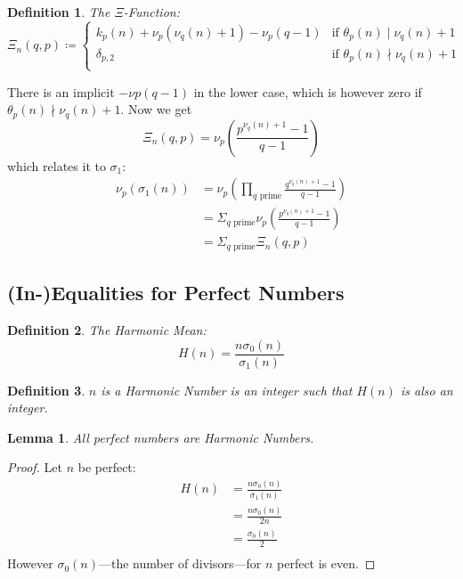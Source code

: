 \documentclass{article}
\newtheorem{definition}{Definition}
\newtheorem{lemma}{Lemma}[section]
\begin{document}
	\begin{definition} The $Ξ$-Function:
		\begin{equation*}
			Ξ_n(q,p) \coloneq 
			\begin{cases}
				k_p(n) + ν_p(ν_q(n) + 1) - ν_p(q-1) & \text{if } θ_p(n) \mid ν_q(n) + 1 \\
				δ_{p,2} & \text{if } θ_p(n) \nmid ν_q(n) + 1 \\
			\end{cases}
		\end{equation*}
	\end{definition}
	There is an implicit $-νp(q-1)$ in the lower case, which is however zero if $θ_p(n) \nmid ν_q(n) + 1$.
	Now we get
	\begin{equation*}
		Ξ_n(q,p) = ν_p\left( \frac{p^{ν_q(n)+1}-1}{q-1} \right)
	\end{equation*}
	which relates it to $σ_1$:
	\begin{equation} \label{eq:6}
		\begin{split}
			ν_p(σ_1(n)) &= ν_p\left(  \prod_{q \text{ prime}} \frac{q^{ν_q(n)+1}-1}{q-1} \right) \\
			&= Σ_{q \text{ prime}} ν_p\left( \frac{p^{ν_q(n)+1}-1}{q-1} \right) \\
			&= Σ_{q \text{ prime}} Ξ_n(q,p)
		\end{split}
	\end{equation}
	
	\subsection{(In-)Equalities for Perfect Numbers}
	
	\begin{definition} The Harmonic Mean:
		\begin{equation*}
			H(n) = \frac{n σ_0(n)}{σ_1(n)}
		\end{equation*}
	\end{definition}
	
	\begin{definition}\label{def:8} $n$ is a Harmonic Number is an integer such that $H(n)$ is also an integer.
	\end{definition}
	
	\begin{lemma}
		All perfect numbers are Harmonic Numbers.
	\end{lemma}
	
	\begin{proof}
		Let $n$ be perfect:
		\begin{equation*}
			\begin{split}
				H(n) &= \frac{nσ_0(n)}{σ_1(n)} \\
				&= \frac{nσ_0(n)}{2n} \\
				&= \frac{σ_0(n)}{2}	\\
			\end{split}
		\end{equation*}
		However $σ_0(n)$—the number of divisors—for $n$ perfect is even.
	\end{proof}
	
\end{document}

